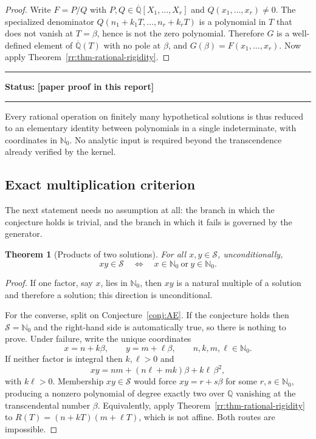 \documentclass[11pt,oneside]{article}
\newtheorem{theorem}{Theorem}[section]
\theoremstyle{definition}
\theoremstyle{remark}
\newcommand{\Nzero}{\mathbb N_0}
\newcommand{\Q}{\mathbb Q}
\newcommand{\Abar}{\overline{\mathbb Q}}
\newcommand{\Sol}{\mathcal S}
\newcommand{\statusnew}{\textcolor{newgreen}{\textbf{[paper proof in this report]}}}
\newenvironment{statusbox}[1]
{\begin{center}\begin{minipage}{0.94\textwidth}\raggedright\hbadness=10000\hrule
\vspace{0.45em}\textbf{Status:} #1\par\vspace{0.35em}}
{\vspace{0.35em}\hrule\end{minipage}\end{center}}
\begin{document}
\begin{proof}
Write $F=P/Q$ with $P,Q\in\Abar[X_1,\ldots,X_r]$ and $Q(x_1,\ldots,x_r)\ne0$.  The
specialized denominator $Q(n_1+k_1T,\ldots,n_r+k_rT)$ is a polynomial in $T$ that does not
vanish at $T=\beta$, hence is not the zero polynomial.  Therefore $G$ is a well-defined
element of $\Abar(T)$ with no pole at $\beta$, and $G(\beta)=F(x_1,\ldots,x_r)$.  Now apply
Theorem~\ref{rr:thm-rational-rigidity}.
\end{proof}

\begin{statusbox}{\statusnew}
\end{statusbox}

Every rational operation on finitely many hypothetical solutions is thus reduced to an
elementary identity between polynomials in a single indeterminate, with coordinates in
$\Nzero$.  No analytic input is required beyond the transcendence already verified by the
kernel.

\subsection{Exact multiplication criterion}

The next statement needs no assumption at all: the branch in which the conjecture holds is
trivial, and the branch in which it fails is governed by the generator.

\begin{theorem}[Products of two solutions]
\label{rr:thm-product}
For all $x,y\in\Sol$, unconditionally,
\[
 \boxed{\quad
 xy\in\Sol
 \quad\Longleftrightarrow\quad
 x\in\Nzero\ \text{or}\ y\in\Nzero .
 \quad}
\]
\end{theorem}

\begin{proof}
If one factor, say $x$, lies in $\Nzero$, then $xy$ is a natural multiple of a solution and
therefore a solution; this direction is unconditional.

For the converse, split on Conjecture~\ref{conj:AE}.  If the conjecture holds then
$\Sol=\Nzero$ and the right-hand side is automatically true, so there is nothing to prove.
Under failure, write the unique coordinates
\[
 x=n+k\beta,
 \qquad
 y=m+\ell\beta ,
 \qquad n,k,m,\ell\in\Nzero .
\]
If neither factor is integral then $k,\ell>0$ and
\[
 xy=nm+(n\ell+mk)\beta+k\ell\,\beta^2 ,
\]
with $k\ell>0$.  Membership $xy\in\Sol$ would force $xy=r+s\beta$ for some $r,s\in\Nzero$,
producing a nonzero polynomial of degree exactly two over $\Q$ vanishing at the
transcendental number $\beta$.  Equivalently, apply Theorem~\ref{rr:thm-rational-rigidity} to
$R(T)=(n+kT)(m+\ell T)$, which is not affine.  Both routes are impossible.
\end{proof}
\end{document}
